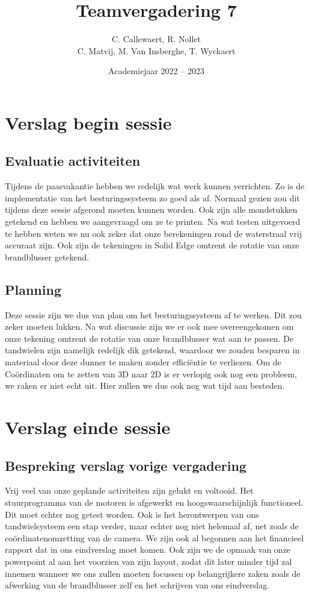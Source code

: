 \documentclass{kulakarticle}
\title{Teamvergadering 7}
\author{C. Callewaert, R. Nollet \\
	C. Matvij, M. Van Insberghe, T. Wyckaert }
\date{Academiejaar 2022 -- 2023}
\begin{document}
	\maketitle
\section{Verslag begin sessie}

	\subsection{Evaluatie activiteiten}
	
	Tijdens de paasvakantie hebben we redelijk wat werk kunnen verrichten. Zo is de implementatie van het besturingssysteem zo goed als af. Normaal gezien zou dit tijdens deze sessie afgerond moeten kunnen worden. Ook zijn alle mondstukken getekend en hebben we aangevraagd om ze te printen. Na wat testen uitgevoerd te hebben weten we nu ook zeker dat onze berekeningen rond de waterstraal vrij accuraat zijn. Ook zijn de tekeningen in Solid Edge omtrent de rotatie van onze brandblusser getekend. 
	
	\subsection{Planning}
	Deze sessie zijn we dus van plan om het besturingssysteem af te werken. Dit zou zeker moeten lukken. 
	Na wat discussie zijn we er ook mee overeengekomen om onze tekening omtrent de rotatie van onze brandblusser wat aan te passen. De tandwielen zijn namelijk redelijk dik getekend, waardoor we zouden besparen in  materiaal door deze dunner te maken zonder efficiëntie te verliezen. Om de Coördinaten om te zetten van 3D naar 2D is er verlopig ook nog een probleem, we raken er niet echt uit. Hier zullen we dus ook nog wat tijd aan besteden.
\section{Verslag einde sessie}

	\subsection{Bespreking verslag vorige vergadering}
	Vrij veel van onze geplande activiteiten zijn gelukt en voltooid. Het stuurprogramma van de motoren is afgewerkt en hoogswaarschijnlijk functioneel. Dit moet echter nog getest worden. Ook is het herontwerpen van ons tandwielsysteem een stap verder, maar echter nog niet helemaal af, net zoals de coördinatenomzetting van de camera. We zijn ook al begonnen aan het financieel rapport dat in ons eindverslag moet komen. Ook zijn we de opmaak van onze powerpoint al aan het voorzien van zijn layout, zodat dit later minder tijd zal innemen wanneer we ons zullen moeten focussen op belangrijkere zaken zoals de afwerking van de brandblusser zelf en het schrijven van ons eindverslag.
	
\end{document}
